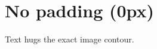 \documentclass{article}
\begin{document}
\section*{No padding (0px)}

Text hugs the exact image contour.

\lipsum[1-8]
\end{document}
